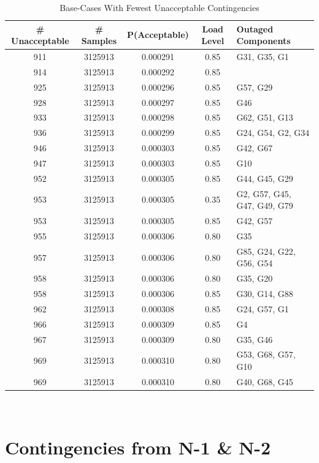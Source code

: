 \documentclass[a4paper,oneside,12pt]{report}
\begin{document}
\begin{table}
\caption{Base-Cases With Fewest Unacceptable Contingencies}
\label{table_results_best}
\centering
\begin{tabular}{c||c||c||c||l}
\bfseries \# Unacceptable & \bfseries \# Samples & \bfseries P(Acceptable) & \bfseries Load Level & \bfseries Outaged Components \\
\hline \hline
911 & 3125913 & 0.000291 & 0.85 & G31, G35, G1  \\  
914 & 3125913 & 0.000292 & 0.85 &   \\  
925 & 3125913 & 0.000296 & 0.85 & G57, G29  \\  
928 & 3125913 & 0.000297 & 0.85 & G46  \\  
933 & 3125913 & 0.000298 & 0.85 & G62, G51, G13  \\  
936 & 3125913 & 0.000299 & 0.85 & G24, G54, G2, G34  \\  
946 & 3125913 & 0.000303 & 0.85 & G42, G67  \\  
947 & 3125913 & 0.000303 & 0.85 & G10  \\  
952 & 3125913 & 0.000305 & 0.85 & G44, G45, G29  \\  
953 & 3125913 & 0.000305 & 0.35 & G2, G57, G45, G47, G49, G79  \\  
953 & 3125913 & 0.000305 & 0.85 & G42, G57  \\  
955 & 3125913 & 0.000306 & 0.80 & G35  \\  
957 & 3125913 & 0.000306 & 0.80 & G85, G24, G22, G56, G54  \\  
958 & 3125913 & 0.000306 & 0.80 & G35, G20  \\  
958 & 3125913 & 0.000306 & 0.85 & G30, G14, G88  \\  
962 & 3125913 & 0.000308 & 0.85 & G24, G57, G1  \\  
966 & 3125913 & 0.000309 & 0.85 & G4  \\  
967 & 3125913 & 0.000309 & 0.80 & G35, G46  \\  
969 & 3125913 & 0.000310 & 0.80 & G53, G68, G57, G10  \\  
969 & 3125913 & 0.000310 & 0.80 & G40, G68, G45  \\  
\hline
\end{tabular}\\
\end{table}


\section{Contingencies from N-1 \& N-2}
\end{document}
